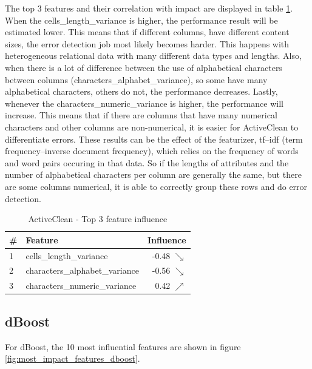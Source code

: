 The top 3 features and their correlation with impact are displayed in table \ref{tab:top_influence_features_activeclean}. When the cells\_length\_variance is higher, the performance result will be estimated lower. This means that if different columns, have different content sizes, the error detection job most likely becomes harder. This happens with heterogeneous relational data with many different data types and lengths. Also, when there is a lot of difference between the use of alphabetical characters between columns (characters\_alphabet\_variance), so some have many alphabetical characters, others do not, the performance decreases. Lastly, whenever the characters\_numeric\_variance is higher, the performance will increase. This means that if there are columns that have many numerical characters and other columns are non-numerical, it is easier for ActiveClean to differentiate errors. These results can be the effect of the featurizer, tf–idf (term frequency–inverse document frequency), which relies on the frequency of words and word pairs occuring in that data. So if the lengths of attributes and the number of alphabetical characters per column are generally the same, but there are some columns numerical, it is able to correctly group these rows and do error detection.

\begin{table}[H]
\centering
\begin{tabular}{llr}
\toprule
 \# &                         Feature &         Influence \\
\midrule
 1 &         cells\_length\_variance &  -0.48 $\searrow$ \\
 2 &  characters\_alphabet\_variance &  -0.56 $\searrow$ \\
 3 &   characters\_numeric\_variance &   0.42 $\nearrow$ \\
\bottomrule
\end{tabular}
\caption{ActiveClean - Top 3 feature influence}
\label{tab:top_influence_features_activeclean}
\end{table}


\subsection{dBoost}
For dBoost, the 10 most influential features are shown in figure \ref{fig:most_impact_features_dboost}. 


